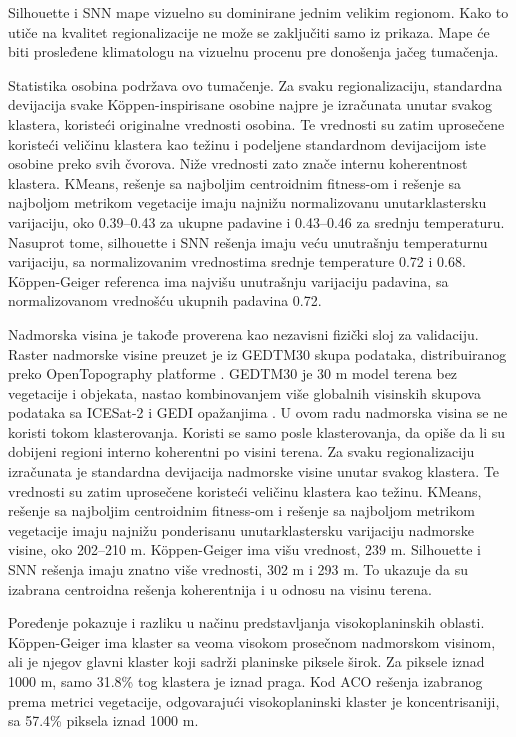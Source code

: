 \documentclass[11pt]{article}
\begin{document}
Silhouette i SNN mape vizuelno su dominirane jednim velikim regionom. Kako to utiče na kvalitet regionalizacije ne može se zaključiti samo iz prikaza. Mape će biti prosleđene klimatologu na vizuelnu procenu pre donošenja jačeg tumačenja.

Statistika osobina podržava ovo tumačenje. Za svaku regionalizaciju, standardna devijacija svake Köppen-inspirisane osobine najpre je izračunata unutar svakog klastera, koristeći originalne vrednosti osobina. Te vrednosti su zatim uprosečene koristeći veličinu klastera kao težinu i podeljene standardnom devijacijom iste osobine preko svih čvorova. Niže vrednosti zato znače internu koherentnost klastera. KMeans, rešenje sa najboljim centroidnim fitness-om i rešenje sa najboljom metrikom vegetacije imaju najnižu normalizovanu unutarklastersku varijaciju, oko 0.39--0.43 za ukupne padavine i 0.43--0.46 za srednju temperaturu. Nasuprot tome, silhouette i SNN rešenja imaju veću unutrašnju temperaturnu varijaciju, sa normalizovanim vrednostima srednje temperature 0.72 i 0.68. Köppen-Geiger referenca ima najvišu unutrašnju varijaciju padavina, sa normalizovanom vrednošću ukupnih padavina 0.72.

Nadmorska visina je takođe proverena kao nezavisni fizički sloj za validaciju. Raster nadmorske visine preuzet je iz GEDTM30 skupa podataka, distribuiranog preko OpenTopography platforme \cite{ho2025gedtm30data}. GEDTM30 je 30 m model terena bez vegetacije i objekata, nastao kombinovanjem više globalnih visinskih skupova podataka sa ICESat-2 i GEDI opažanjima \cite{ho2025gedtm30}. U ovom radu nadmorska visina se ne koristi tokom klasterovanja. Koristi se samo posle klasterovanja, da opiše da li su dobijeni regioni interno koherentni po visini terena. Za svaku regionalizaciju izračunata je standardna devijacija nadmorske visine unutar svakog klastera. Te vrednosti su zatim uprosečene koristeći veličinu klastera kao težinu. KMeans, rešenje sa najboljim centroidnim fitness-om i rešenje sa najboljom metrikom vegetacije imaju najnižu ponderisanu unutarklastersku varijaciju nadmorske visine, oko 202--210 m. Köppen-Geiger ima višu vrednost, 239 m. Silhouette i SNN rešenja imaju znatno više vrednosti, 302 m i 293 m. To ukazuje da su izabrana centroidna rešenja koherentnija i u odnosu na visinu terena.

Poređenje pokazuje i razliku u načinu predstavljanja visokoplaninskih oblasti. Köppen-Geiger ima klaster sa veoma visokom prosečnom nadmorskom visinom, ali je njegov glavni klaster koji sadrži planinske piksele širok. Za piksele iznad 1000 m, samo 31.8\% tog klastera je iznad praga. Kod ACO rešenja izabranog prema metrici vegetacije, odgovarajući visokoplaninski klaster je koncentrisaniji, sa 57.4\% piksela iznad 1000 m.
\end{document}
